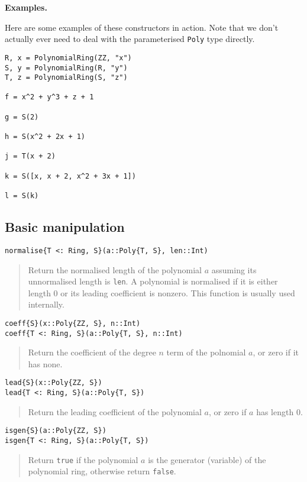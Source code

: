 \documentclass[a4paper,10pt]{article}
\newcommand{\code}{\lstinline}
\newcommand{\desc}[1]{\vspace{-3mm}\begin{quote}#1\end{quote}}
\begin{document}
{{{{{{\textbf{Examples.}

Here are some examples of these constructors in action. Note that we don't actually
ever need to deal with the parameterised \code{Poly} type directly.

\begin{lstlisting}
R, x = PolynomialRing(ZZ, "x")
S, y = PolynomialRing(R, "y")
T, z = PolynomialRing(S, "z")

f = x^2 + y^3 + z + 1

g = S(2)

h = S(x^2 + 2x + 1)

j = T(x + 2)

k = S([x, x + 2, x^2 + 3x + 1])

l = S(k)
\end{lstlisting}

\subsection{Basic manipulation}

\begin{lstlisting}
normalise{T <: Ring, S}(a::Poly{T, S}, len::Int)
\end{lstlisting}

\desc{Return the normalised length of the polynomial $a$ assuming its unnormalised
length is \code{len}. A polynomial is normalised if it is either length $0$ or its
leading coefficient is nonzero. This function is usually used internally.}

\begin{lstlisting}
coeff{S}(x::Poly{ZZ, S}, n::Int)
coeff{T <: Ring, S}(a::Poly{T, S}, n::Int)
\end{lstlisting}

\desc{Return the coefficient of the degree $n$ term of the polnomial $a$, or zero
if it has none.}

\begin{lstlisting}
lead{S}(x::Poly{ZZ, S})
lead{T <: Ring, S}(a::Poly{T, S})
\end{lstlisting}

\desc{Return the leading coefficient of the polynomial $a$, or zero if $a$ has
length $0$.}

\begin{lstlisting}
isgen{S}(a::Poly{ZZ, S})
isgen{T <: Ring, S}(a::Poly{T, S})
\end{lstlisting}

\desc{Return \code{true} if the polynomial $a$ is the generator (variable) of the
polynomial ring, otherwise return \code{false}.}

}}}}}}
\end{document}
